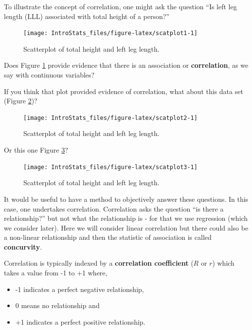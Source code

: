 \documentclass[
  oneside]{krantz}
\providecommand{\tightlist}{%
  \setlength{\itemsep}{0pt}\setlength{\parskip}{0pt}}
\begin{document}
To illustrate the concept of correlation, one might ask the question ``Is left leg length (LLL) associated with total height of a person?''

\begin{figure}

{\centering \texttt{[image: IntroStats\_files/figure-latex/scatplot1-1]} 

}

\caption{Scatterplot of total height and left leg length.}\label{fig:scatplot1}
\end{figure}

Does Figure \ref{fig:scatplot1} provide evidence that there is an association or \textbf{correlation}, as we say with continuous variables?

If you think that plot provided evidence of correlation, what about this data set (Figure \ref{fig:scatplot2})?

\begin{figure}

{\centering \texttt{[image: IntroStats\_files/figure-latex/scatplot2-1]} 

}

\caption{Scatterplot of total height and left leg length.}\label{fig:scatplot2}
\end{figure}

Or this one Figure \ref{fig:scatplot3}?

\begin{figure}

{\centering \texttt{[image: IntroStats\_files/figure-latex/scatplot3-1]} 

}

\caption{Scatterplot of total height and left leg length.}\label{fig:scatplot3}
\end{figure}

It would be useful to have a method to objectively answer these questions. In this case, one undertakes correlation. Correlation asks the question ``is there a relationship?'' but not what the relationship is - for that we use regression (which we consider later). Here we will consider linear correlation but there could also be a non-linear relationship and then the statistic of association is called \textbf{concurvity}.

Correlation is typically indexed by a \textbf{correlation coefficient} (\(R\) or \(r\)) which takes a value from -1 to +1 where,

\begin{itemize}
\tightlist
\item
  -1 indicates a perfect negative relationship,
\item
  0 means no relationship and
\item
  +1 indicates a perfect positive relationship.
\end{itemize}
\end{document}
